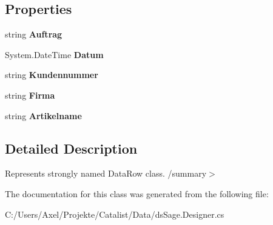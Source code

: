 \subsection*{Properties}
\begin{DoxyCompactItemize}
\item 
string {\bfseries Auftrag}\hypertarget{class_products_1_1_data_1_1ds_sage_1_1_auftrag_pro_artikel_row_a730ea9eeb524d4ea26b898d51902805a}{}\label{class_products_1_1_data_1_1ds_sage_1_1_auftrag_pro_artikel_row_a730ea9eeb524d4ea26b898d51902805a}

\item 
System.\+Date\+Time {\bfseries Datum}\hypertarget{class_products_1_1_data_1_1ds_sage_1_1_auftrag_pro_artikel_row_a74d077bb3b29bf6b3be90885c2efe231}{}\label{class_products_1_1_data_1_1ds_sage_1_1_auftrag_pro_artikel_row_a74d077bb3b29bf6b3be90885c2efe231}

\item 
string {\bfseries Kundennummer}\hypertarget{class_products_1_1_data_1_1ds_sage_1_1_auftrag_pro_artikel_row_a2d2df4ef7c027762844ca21da6bfc23b}{}\label{class_products_1_1_data_1_1ds_sage_1_1_auftrag_pro_artikel_row_a2d2df4ef7c027762844ca21da6bfc23b}

\item 
string {\bfseries Firma}\hypertarget{class_products_1_1_data_1_1ds_sage_1_1_auftrag_pro_artikel_row_aa8ed2b77bf4108d26a5596dc66ca2797}{}\label{class_products_1_1_data_1_1ds_sage_1_1_auftrag_pro_artikel_row_aa8ed2b77bf4108d26a5596dc66ca2797}

\item 
string {\bfseries Artikelname}\hypertarget{class_products_1_1_data_1_1ds_sage_1_1_auftrag_pro_artikel_row_a6277ee7deb0f947bdb71cafc9e62f904}{}\label{class_products_1_1_data_1_1ds_sage_1_1_auftrag_pro_artikel_row_a6277ee7deb0f947bdb71cafc9e62f904}

\end{DoxyCompactItemize}


\subsection{Detailed Description}
Represents strongly named Data\+Row class. /summary$>$ 

The documentation for this class was generated from the following file\+:\begin{DoxyCompactItemize}
\item 
C\+:/\+Users/\+Axel/\+Projekte/\+Catalist/\+Data/ds\+Sage.\+Designer.\+cs\end{DoxyCompactItemize}
